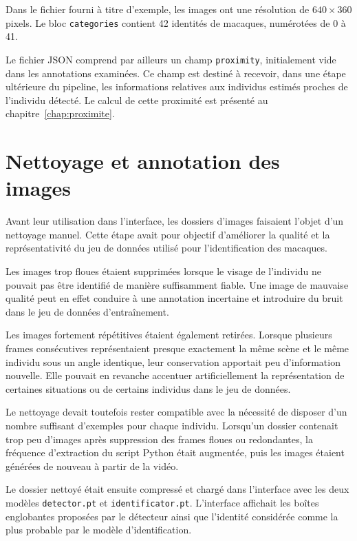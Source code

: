 \documentclass[11pt,a4paper]{report}
\begin{document}
Dans le fichier fourni à titre d'exemple, les images ont une résolution de
$640 \times 360$ pixels. Le bloc \texttt{categories} contient 42 identités de
macaques, numérotées de 0 à 41.

Le fichier JSON comprend par ailleurs un champ \texttt{proximity}, initialement
vide dans les annotations examinées. Ce champ est destiné à recevoir, dans une
étape ultérieure du pipeline, les informations relatives aux individus estimés
proches de l'individu détecté. Le calcul de cette proximité est présenté au
chapitre~\ref{chap:proximite}.

\section{Nettoyage et annotation des images}

Avant leur utilisation dans l'interface, les dossiers d'images faisaient
l'objet d'un nettoyage manuel. Cette étape avait pour objectif d'améliorer la
qualité et la représentativité du jeu de données utilisé pour l'identification
des macaques.

Les images trop floues étaient supprimées lorsque le visage de l'individu ne
pouvait pas être identifié de manière suffisamment fiable. Une image de mauvaise
qualité peut en effet conduire à une annotation incertaine et introduire du
bruit dans le jeu de données d'entraînement.

Les images fortement répétitives étaient également retirées. Lorsque plusieurs
frames consécutives représentaient presque exactement la même scène et le même
individu sous un angle identique, leur conservation apportait peu d'information
nouvelle. Elle pouvait en revanche accentuer artificiellement la représentation
de certaines situations ou de certains individus dans le jeu de données.

Le nettoyage devait toutefois rester compatible avec la nécessité de disposer
d'un nombre suffisant d'exemples pour chaque individu. Lorsqu'un dossier
contenait trop peu d'images après suppression des frames floues ou redondantes,
la fréquence d'extraction du script Python était augmentée, puis les images
étaient générées de nouveau à partir de la vidéo.

Le dossier nettoyé était ensuite compressé et chargé dans l'interface avec les
deux modèles \texttt{detector.pt} et \texttt{identificator.pt}. L'interface
affichait les boîtes englobantes proposées par le détecteur ainsi que l'identité
considérée comme la plus probable par le modèle d'identification.
\end{document}
